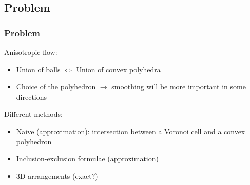 \documentclass{beamer}
\begin{document}
\subsection{Problem}
\begin{frame}
    \frametitle{Problem}

    Anisotropic flow:
    \begin{itemize}
        \item Union of balls $ \iff $ Union of convex polyhedra
        \item Choice of the polyhedron $ \to $ smoothing will be more important
            in some directions
    \end{itemize}

    Different methods:
    \begin{itemize}
        \item Naive (approximation): intersection between a Voronoi cell and a
            convex polyhedron
        \item Inclusion-exclusion formulae (approximation)
        \item 3D arrangements (exact?)
    \end{itemize}
\end{frame}
\end{document}
